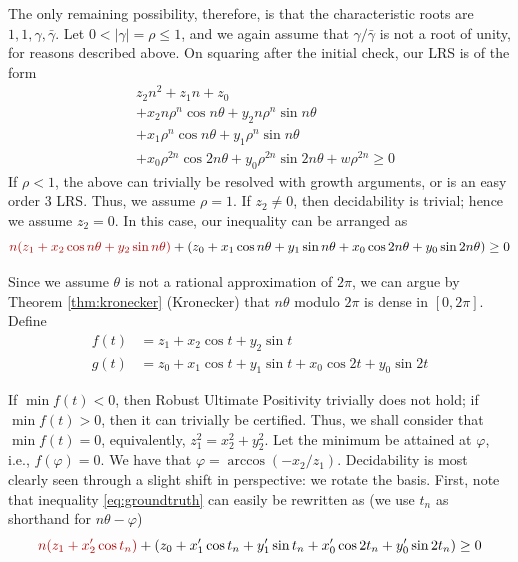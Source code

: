 The only remaining possibility, therefore, is that the characteristic roots are $1, 1, \gamma, \bar{\gamma}$. Let $0 < |\gamma| = \rho \le 1$, and we again assume that $\gamma/\bar{\gamma}$ is not a root of unity, for reasons described above. On squaring after the initial check, our LRS is of the form
\begin{align*}
&z_2n^2 + z_1n + z_0  \\
&+ x_2 n \rho^n \cos n\theta + y_2 n \rho^n \sin n\theta  \\
&+ x_1\rho^n\cos n\theta + y_1\rho^n\sin n\theta  \\
&+ x_0 \rho^{2n}\cos 2n\theta + y_0 \rho^{2n} \sin 2n\theta + w\rho^{2n} \ge 0
\end{align*}
If $\rho < 1$, the above can trivially be resolved with growth arguments, or is an easy order $3$ LRS. Thus, we assume $\rho = 1$. If $z_2 \ne 0$, then decidability is trivial; hence we assume $z_2 = 0$. In this case, our inequality can be arranged as
\begin{equation}
\label{eq:groundtruth}
{\color{red!70!black} n(z_1 + x_2\cos n\theta + y_2\sin n\theta)} + (z_0 + x_1\cos n\theta + y_1\sin n\theta + x_0\cos 2n\theta + y_0\sin 2n\theta) \ge 0
\end{equation}

Since we assume $\theta$ is not a rational approximation of $2\pi$, we can argue by Theorem \ref{thm:kronecker} (Kronecker) that $n\theta$ modulo ${2\pi}$ is dense in $[0, 2\pi]$. Define
\begin{align}
f(t) &= z_1 + x_2\cos t + y_2\sin t \\
g(t) &= z_0 + x_1\cos t + y_1\sin t + x_0\cos 2t + y_0\sin 2t
\end{align}

If $\min f(t) < 0$, then Robust Ultimate Positivity trivially does not hold; if $\min f(t) > 0$, then it can trivially be certified. Thus, we shall consider that $\min f(t) = 0$, equivalently, $z_1^2 = x_2^2 + y_2^2$. Let the minimum be attained at $\varphi$, i.e., $f(\varphi) = 0$. We have that $\varphi = \arccos(-x_2/z_1)$. Decidability is most clearly seen through a slight shift in perspective: we rotate the basis.
First, note that inequality \ref{eq:groundtruth} can easily be rewritten as (we use $t_n$ as shorthand for $n\theta - \varphi$)
\begin{equation}
\label{eq:groundtruthrewrite}
{\color{red!70!black}n(z_1 + x_2' \cos t_n)} + (z_0 + x_1'\cos t_n + y_1'\sin t_n + x_0'\cos 2t_n + y_0'\sin 2t_n) \ge 0
\end{equation}

